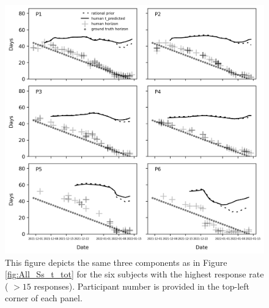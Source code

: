 \documentclass[a4paper,man,natbib]{apa6}
\begin{document}
\begin{figure}
    \centering
    \includegraphics[width=\linewidth]{Figures/Single_Subjects.png}
    \caption{
    This figure depicts the same three components as in Figure \ref{fig:All_Ss_t_tot} for the six subjects with the highest response rate ( $> 15$ responses). Participant number is provided in the top-left corner of each panel.
    }
    \label{fig:Single_Ss_t_tot}
\end{figure}

\end{document}
